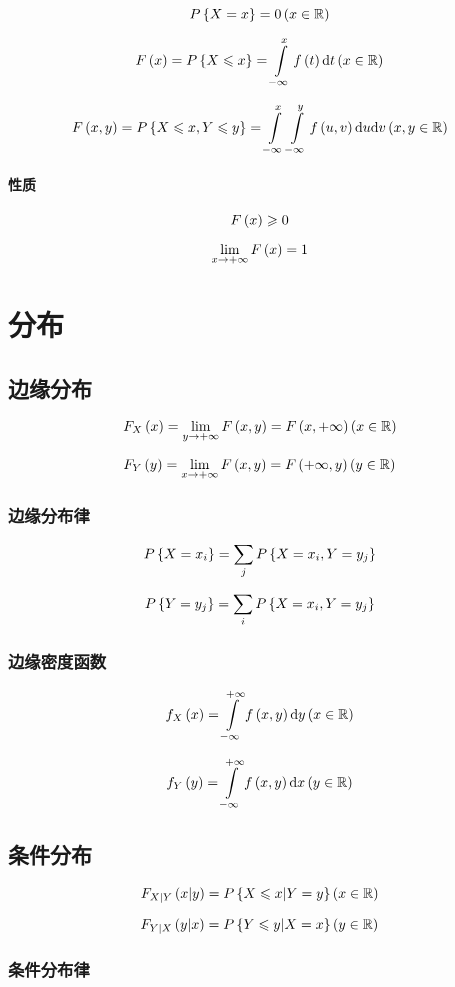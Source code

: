 \documentclass{article}
\begin{document}
\[P\br{X=x}=0\p{x\in\sr}\]

\[F\p{x}=P\br{X\leqslant x}=\int\limits_{-\infty}^xf\p{t}\d t\p{x\in\sr}\]

\[F\p{x,y}=P\br{X\leqslant x,Y\leqslant y}=\int\limits_{-\infty}^x\int\limits_{-\infty}^yf\p{u,v}\d u\d v\p{x,y\in\sr}\]

\paragraph{性质}

\[F\p{x}\geqslant0\]

\[\lim_{x\to+\infty}F\p{x}=1\]

\section{分布}

\subsection{边缘分布}

\[F_X\p{x}=\lim_{y\to+\infty}F\p{x,y}=F\p{x,+\infty}\p{x\in\sr}\]

\[F_Y\p{y}=\lim_{x\to+\infty}F\p{x,y}=F\p{+\infty,y}\p{y\in\sr}\]

\subsubsection{边缘分布律}

\[P\br{X=x_i}=\sum_jP\br{X=x_i,Y=y_j}\]

\[P\br{Y=y_j}=\sum_iP\br{X=x_i,Y=y_j}\]

\subsubsection{边缘密度函数}

\[f_X\p{x}=\impint f\p{x,y}\d y\p{x\in\sr}\]

\[f_Y\p{y}=\impint f\p{x,y}\d x\p{y\in\sr}\]

\subsection{条件分布}

\[F_{X|Y}\p{x|y}=P\br{X\leqslant x|Y=y}\p{x\in\sr}\]

\[F_{Y|X}\p{y|x}=P\br{Y\leqslant y|X=x}\p{y\in\sr}\]

\subsubsection{条件分布律}
\end{document}
